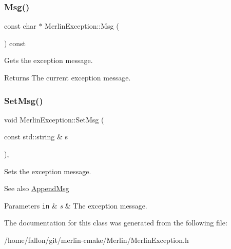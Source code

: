 \subsubsection{\texorpdfstring{Msg()}{Msg()}}
{\footnotesize\ttfamily const char $\ast$ Merlin\+Exception\+::\+Msg (\begin{DoxyParamCaption}{ }\end{DoxyParamCaption}) const\hspace{0.3cm}{\ttfamily [inline]}}

Gets the exception message. \begin{DoxyReturn}{Returns}
The current exception message. 
\end{DoxyReturn}
\mbox{\label{classMerlinException_a51f0305351accf8471662e3fa8ba4e7f}} 
\subsubsection{\texorpdfstring{Set\+Msg()}{SetMsg()}}
{\footnotesize\ttfamily void Merlin\+Exception\+::\+Set\+Msg (\begin{DoxyParamCaption}\item[{const std\+::string \&}]{s }\end{DoxyParamCaption})\hspace{0.3cm}{\ttfamily [inline]}, {\ttfamily [protected]}}

Sets the exception message. \begin{DoxySeeAlso}{See also}
\hyperlink{classMerlinException_a056d45fb247c29660580c9c1d350f245}{Append\+Msg} 
\end{DoxySeeAlso}

\begin{DoxyParams}[1]{Parameters}
\mbox{\tt in}  & {\em s} & The exception message. \\
\hline
\end{DoxyParams}


The documentation for this class was generated from the following file\+:\begin{DoxyCompactItemize}
\item 
/home/fallon/git/merlin-\/cmake/\+Merlin/Merlin\+Exception.\+h\end{DoxyCompactItemize}
